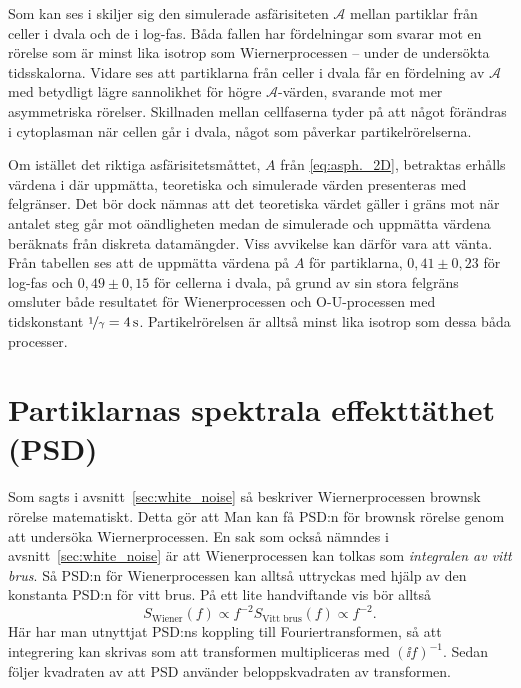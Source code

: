 Som kan ses i  skiljer sig den simulerade asfärisiteten $\mathcal{A}$ mellan partiklar från celler i dvala och de i log-fas. Båda fallen har fördelningar som svarar mot en rörelse som är minst lika isotrop som Wiernerprocessen -- under de undersökta tidsskalorna. Vidare ses att partiklarna från celler i dvala får en fördelning av $\mathcal{A}$ med betydligt lägre sannolikhet för högre $\mathcal{A}$-värden, svarande mot mer asymmetriska rörelser. Skillnaden mellan cellfaserna tyder på att något förändras i cytoplasman när cellen går i dvala, något som påverkar partikelrörelserna. 

Om istället det riktiga asfärisitetsmåttet, $A$ från \eqref{eq:asph._2D}, betraktas erhålls värdena i  där uppmätta, teoretiska och simulerade värden presenteras med felgränser. Det bör dock nämnas att det teoretiska värdet gäller i gräns mot när antalet steg går mot oändligheten medan de simulerade och uppmätta värdena beräknats från diskreta datamängder. Viss avvikelse kan därför vara att vänta. Från tabellen ses att de uppmätta värdena på $A$ för partiklarna, $0,41\pm0,23$ för log-fas och $0,49\pm0,15$ för cellerna i dvala, på grund av sin stora felgräns omsluter både resultatet för Wienerprocessen och O-U-processen med tidskonstant $\nicefrac{1}{\gamma}=\unit[4]{s}$. Partikelrörelsen är alltså minst lika isotrop som dessa båda processer.



\section{Partiklarnas spektrala effekttäthet (PSD)}



Som sagts i avsnitt~\ref{sec:white_noise} så beskriver Wiernerprocessen brownsk rörelse matematiskt. Detta gör att Man kan få PSD:n för brownsk rörelse genom att undersöka Wiernerprocessen. En sak som också nämndes i avsnitt~\ref{sec:white_noise} är att Wienerprocessen kan tolkas som \emph{integralen av vitt brus}. Så PSD:n för Wienerprocessen kan alltså uttryckas med hjälp av den konstanta PSD:n för vitt brus.
På ett lite handviftande vis bör alltså 
\begin{equation}
S_\text{Wiener} (f) \propto f^{-2} S_\text{Vitt brus}(f) \propto f^{-2}.
\end{equation}
Här har man utnyttjat PSD:ns koppling till Fouriertransformen, så att integrering kan skrivas som att transformen multipliceras med $(\ii f)^{-1}$. Sedan följer kvadraten av att PSD använder beloppskvadraten av transformen. 

